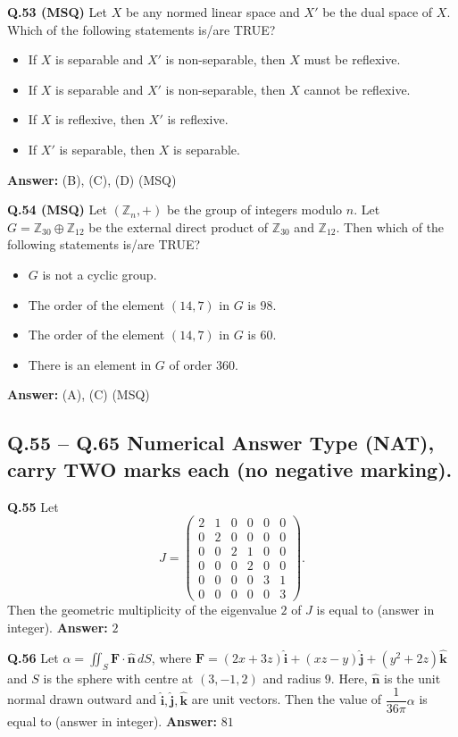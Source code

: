 \documentclass[11pt,a4paper]{article}
\newcommand{\optslistA}[4]{%
  \begin{itemize}
    \setlength{\itemsep}{2pt}\setlength{\parskip}{0pt}
    \item[(A)] #1
    \item[(B)] #2
    \item[(C)] #3
    \item[(D)] #4
  \end{itemize}%
}
\newcommand{\ans}[1]{\textbf{Answer:} #1\par\medskip}
\begin{document}
\textbf{Q.53 (MSQ)} Let $X$ be any normed linear space and $X'$ be the dual space of $X$. Which of the following statements is/are TRUE?
\optslistA{If $X$ is separable and $X'$ is non-separable, then $X$ must be reflexive.}{If $X$ is separable and $X'$ is non-separable, then $X$ cannot be reflexive.}{If $X$ is reflexive, then $X'$ is reflexive.}{If $X'$ is separable, then $X$ is separable.}
\ans{(B), (C), (D) (MSQ)}

\textbf{Q.54 (MSQ)} Let $(\mathbb{Z}_n, +)$ be the group of integers modulo $n$. Let $G = \mathbb{Z}_{30} \oplus \mathbb{Z}_{12}$ be the external direct product of $\mathbb{Z}_{30}$ and $\mathbb{Z}_{12}$. Then which of the following statements is/are TRUE?
\optslistA{$G$ is not a cyclic group.}{The order of the element $(14, 7)$ in $G$ is $98$.}{The order of the element $(14, 7)$ in $G$ is $60$.}{There is an element in $G$ of order $360$.}
\ans{(A), (C) (MSQ)}

\subsection*{Q.55 -- Q.65 Numerical Answer Type (NAT), carry TWO marks each (no negative marking).}

\textbf{Q.55} Let
\[
  J = \begin{pmatrix}
    2 & 1 & 0 & 0 & 0 & 0 \\
    0 & 2 & 0 & 0 & 0 & 0 \\
    0 & 0 & 2 & 1 & 0 & 0 \\
    0 & 0 & 0 & 2 & 0 & 0 \\
    0 & 0 & 0 & 0 & 3 & 1 \\
    0 & 0 & 0 & 0 & 0 & 3
  \end{pmatrix}.
\]
Then the geometric multiplicity of the eigenvalue $2$ of $J$ is equal to \underline{\hspace{2cm}} (answer in integer).
\ans{$2$}

\textbf{Q.56} Let $\alpha = \iint_S \mathbf{F} \cdot \hat{\mathbf{n}}\,dS$, where $\mathbf{F} = (2x + 3z)\hat{\mathbf{i}} + (xz - y)\hat{\mathbf{j}} + (y^2 + 2z)\hat{\mathbf{k}}$ and $S$ is the sphere with centre at $(3, -1, 2)$ and radius $9$. Here, $\hat{\mathbf{n}}$ is the unit normal drawn outward and $\hat{\mathbf{i}}, \hat{\mathbf{j}}, \hat{\mathbf{k}}$ are unit vectors. Then the value of $\dfrac{1}{36\pi}\alpha$ is equal to \underline{\hspace{2cm}} (answer in integer).
\ans{$81$}
\end{document}
